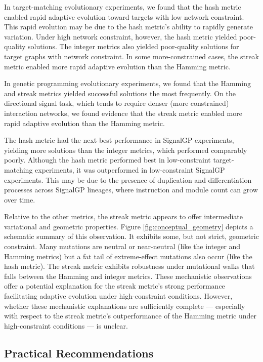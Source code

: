 In target-matching evolutionary experiments, we found that the hash metric enabled rapid adaptive evolution toward targets with low network constraint.
This rapid evolution may be due to the hash metric's ability to rapidly generate variation.
Under high network constraint, however, the hash metric yielded poor-quality solutions.
The integer metrics also yielded poor-quality solutions for target graphs with network constraint.
In some more-constrained cases, the streak metric enabled more rapid adaptive evolution than the Hamming metric.


In genetic programming evolutionary experiments, we found that the Hamming and streak metrics yielded successful solutions the most frequently.
On the directional signal task, which tends to require denser (more constrained) interaction networks, we found evidence that the streak metric enabled more rapid adaptive evolution than the Hamming metric.

The hash metric had the next-best performance in SignalGP experiments, yielding more solutions than the integer metrics, which performed comparably poorly.
Although the hash metric performed best in low-constraint target-matching experiments, it was outperformed in low-constraint SignalGP experiments.
This may be due to the presence of duplication and differentiation processes across SignalGP lineages, where instruction and module count can grow over time.



Relative to the other metrics, the streak metric appears to offer intermediate variational and geometric properties.
Figure \ref{fig:conceptual_geometry} depicts a schematic summary of this observation.
It exhibits some, but not strict, geometric constraint.
Many mutations are neutral or near-neutral (like the integer and Hamming metrics) but a fat tail of extreme-effect mutations also occur (like the hash metric).
The streak metric exhibits robustness under mutational walks that falls between the Hamming and integer metrics.
These mechanistic observations offer a potential explanation for the streak metric's strong performance facilitating adaptive evolution under high-constraint conditions.
However, whether these mechanistic explanations are sufficiently complete --- especially with respect to the streak metric's outperformance of the Hamming metric under high-constraint conditions --- is unclear.

\subsection{Practical Recommendations}

